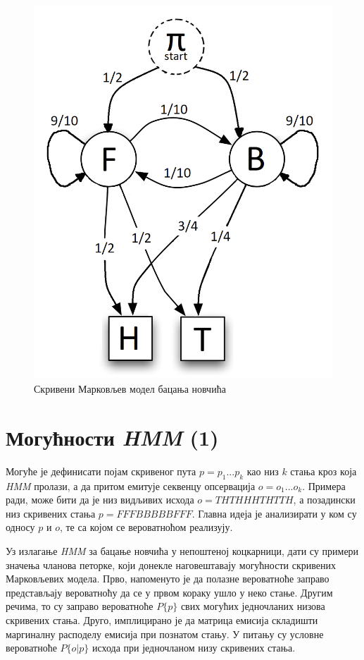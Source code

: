 \documentclass[12pt,oneside]{memoir}
\begin{document}
\begin{CJK}{UTF8}{ipxm}
\begin{figure}[!ht]
  \centering
  \includegraphics[width=.5\textwidth]{kockarnica.png}
  \caption{Скривени Марковљев модел бацања новчића}
  \label{fig:kock}
\end{figure}

\section{Могућности \textit{HMM} (1)}
Могуће је дефинисати појам скривеног пута $p = p_1...p_k$ као низ $k$ стања кроз која \textit{HMM} пролази, а да притом емитује секвенцу опсервација $o = o_1...o_k$. Примера ради, може бити да је низ видљивих исхода $o = THTHHHTHTTH$, а позадински низ скривених стања $p = FFFBBBBBFFF$. Главна идеја је анализирати у ком су односу $p$ и $o$, те са којом се вероватноћом реализују.

Уз излагање \textit{HMM} за бацање новчића у непоштеној коцкарници, дати су примери значења чланова петорке, који донекле наговештавају могућности скривених Марковљевих модела. Прво, напоменуто је да полазне вероватноће заправо представљају вероватноћу да се у првом кораку ушло у неко стање. Другим речима, то су заправо вероватноће $P\{p\}$ свих могућих једночланих низова скривених стања. Друго, имплицирано је да матрица емисија складишти маргиналну расподелу емисија при познатом стању. У питању су условне вероватноће $P\{o | p\}$ исхода при једночланом низу скривених стања.


\end{CJK}
\end{document}

